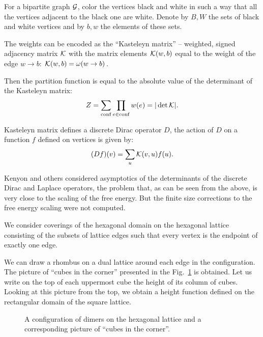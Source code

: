 \documentclass{article}
\begin{document}
For a bipartite graph ${\cal G}$, color the vertices black and white in such a way that all the
vertices adjacent to the black one are white. Denote by $B, W$ the sets of black and white
vertices and by $b,w$ the elements of these sets. 

The weights can be encoded as the ``Kasteleyn matrix'' -- weighted, signed adjacency matrix ${\cal K}$ with
the matrix elements ${\cal K}(w,b)$ equal to the weight of the edge $w\to b$: ${\cal K}(w,b)=\omega(w\to b)$.

Then the partition function is equal to the absolute value of the determinant of the Kasteleyn
matrix\cite{P.W-1961,doi:10.1080/14786436108243366}: 
\begin{equation}
  \label{eq:15}
  Z=\sum_{\mathrm{conf}}\prod_{e\in \mathrm{conf}}w(e)=|\det {\cal K}|.
\end{equation}

Kasteleyn matrix defines a discrete Dirac operator $D$, the action of $D$ on a function $f$ defined
on vertices is given by:
\begin{equation}
  \label{eq:16}
  (Df)(v)=\sum_{u}{\cal K}(v,u) f(u).
\end{equation}

Kenyon \cite{kenyon2002laplacian,kenyon2000asymptotic} and others \cite{sridhar2015asymptotic}
considered asymptotics of the determinants of the discrete Dirac and Laplace operators, the problem
that, as can be seen from the above, is very close to the scaling of the free energy. But the finite
size corrections to the free energy scaling were not computed. 
  
We consider coverings of the hexagonal domain on the hexagonal lattice consisting of the subsets of
lattice edges such that every vertex is the endpoint of exactly one edge.

We can draw a rhombus on a dual lattice around each edge in the configuration. The picture of
``cubes in the corner'' presented in the Fig.~\ref{dhf} is obtained. Let us write on the top of each
uppermost cube the height of its column of cubes. Looking at this picture from the top, we obtain a
height function defined on the rectangular domain of the square lattice. 

\begin{figure}[htbp]
\caption{\label{dhf}A configuration of dimers on the hexagonal lattice and a corresponding picture
  of ``cubes in the corner''.}
\end{figure}
\end{document}
